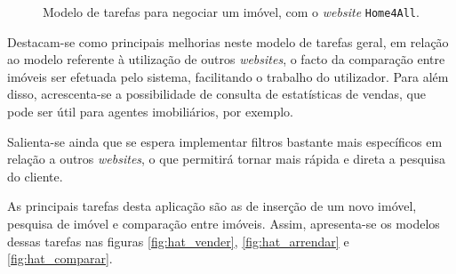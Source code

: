 \begin{figure}[H]
    \centering

    \vspace{0.4cm}
    
    
    \vspace{0.1cm}
    

    \caption{Modelo de tarefas para negociar um imóvel, com o \textit{website} \texttt{Home4All}.}
    \label{fig:modelo_tarefas_depois}
\end{figure}

Destacam-se como principais melhorias neste modelo de tarefas geral, em relação ao modelo referente à utilização de outros \textit{websites}, o facto da comparação entre imóveis ser efetuada pelo sistema, facilitando o trabalho do utilizador. Para além disso, acrescenta-se a possibilidade de consulta de estatísticas de vendas, que pode ser útil para agentes imobiliários, por exemplo.

Salienta-se ainda que se espera implementar filtros bastante mais específicos em relação a outros \textit{websites}, o que permitirá tornar mais rápida e direta a pesquisa do cliente.

As principais tarefas desta aplicação são as de inserção de um novo imóvel, pesquisa de imóvel e comparação entre imóveis. Assim, apresenta-se os modelos dessas tarefas nas figuras \ref{fig:hat_vender}, \ref{fig:hat_arrendar} e \ref{fig:hat_comparar}.

